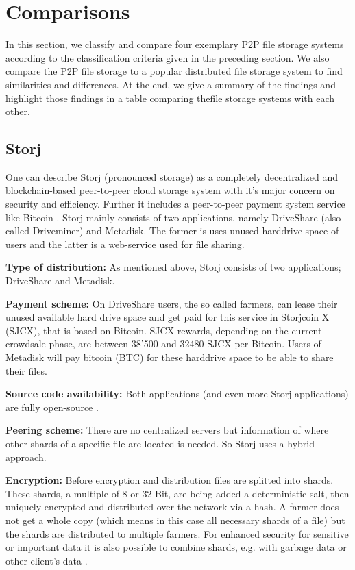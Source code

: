 \section{Comparisons} In this section, we classify and compare four exemplary P2P file storage systems according to the classification criteria given in the preceding section. We also compare the P2P file storage to a popular distributed file storage system to find similarities and differences. At the end, we give a summary of the findings and highlight those findings in a table comparing thefile storage systems with each other.

\subsection{Storj} %
One can describe Storj (pronounced storage) as a completely decentralized and blockchain-based peer-to-peer cloud storage system with it's major concern on security and efficiency. Further it includes a peer-to-peer payment system service like Bitcoin \cite{storj:blog:what_is_storj}. Storj mainly consists of two applications, namely DriveShare (also called Driveminer)
and Metadisk. The former is uses unused harddrive space of users and the latter is a web-service used for file sharing.

\textbf{Type of distribution:} As mentioned above, Storj consists of two applications; DriveShare and Metadisk.

\textbf{Payment scheme:} On DriveShare users, the so called farmers, can lease their unused available hard drive space and get paid for this service in Storjcoin X (SJCX), that is based on Bitcoin. SJCX rewards, depending on the current crowdsale phase, are between 38'500 and 32480 SJCX per Bitcoin\cite{storj:crowdsale}. Users of Metadisk will pay bitcoin (BTC) for these harddrive space to be able to share their files.

\textbf{Source code availability:} Both applications (and even more Storj applications) are fully open-source \cite{storj:github}.

\textbf{Peering scheme:} There are no centralized servers but information of where other shards of a specific file are located is needed. So Storj uses a hybrid approach.

\textbf{Encryption:} Before encryption and distribution files are splitted into shards. These shards, a multiple of 8 or 32 Bit, are being added a deterministic salt, then uniquely encrypted and distributed over the network via a hash. A farmer does not get a whole copy (which means in this case all necessary shards of a file) but the shards are distributed to multiple farmers. For enhanced security for sensitive or important data it is also possible to combine shards, e.g. with garbage data or other client's data  \cite{storj:PDF}.

